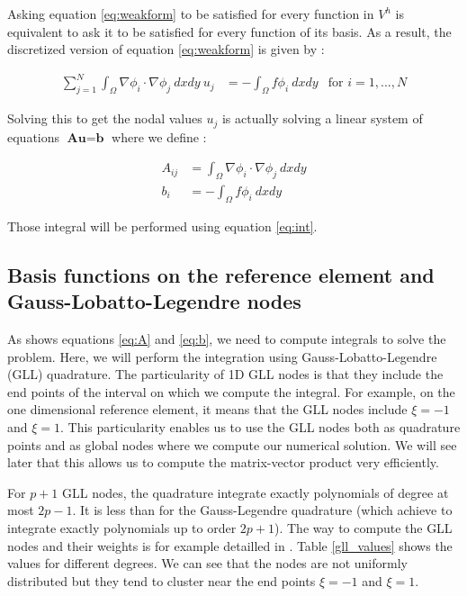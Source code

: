 Asking equation \ref{eq:weakform} to be satisfied for every function in $V^h$ is equivalent to ask it to be satisfied for every function of its basis. As a result, the discretized version of equation \ref{eq:weakform} is given by : 

\begin{align}
\sum_{j = 1}^N \int_\Omega \nabla \phi_i \cdot \nabla \phi_j \:dxdy \: u_j &= -\int_\Omega f\phi_i \:dxdy &\text{for $i=1,...,N$} 
\end{align}

Solving this to get the nodal values $u_j$ is actually solving a linear system of equations $\textbf{Au}=\textbf{b}$ where we define : 

\begin{align}
A_{ij} &= \int_\Omega \nabla \phi_i \cdot \nabla \phi_j \:dxdy \label{eq:A}\\
b_i &= -\int_\Omega f\phi_i \:dxdy \label{eq:b}
\end{align}

Those integral will be performed using equation \ref{eq:int}.

\subsection{Basis functions on the reference element and Gauss-Lobatto-Legendre nodes}

As shows equations \ref{eq:A} and \ref{eq:b}, we need to compute integrals to solve the problem. Here, we will perform the integration using Gauss-Lobatto-Legendre (GLL) quadrature. The particularity of 1D GLL nodes is that they include the end points of the interval on which we compute the integral. For example, on the one dimensional reference element, it means that the GLL nodes include $\xi = -1$ and $\xi=1$. This particularity enables us to use the GLL nodes both as quadrature points and as global nodes where we compute our numerical solution. We will see later that this allows us to compute the matrix-vector product very efficiently. 

For $p+1$ GLL nodes, the quadrature integrate exactly polynomials of degree at most $2p-1$. It is less than for the Gauss-Legendre quadrature (which achieve to integrate exactly polynomials up to order $2p+1$). The way to compute the GLL nodes and their weights is for example detailled in \cite{gll_nodes}. Table \ref{gll_values} shows the values for different degrees. We can see that the nodes are not uniformly distributed but they tend to cluster near the end points $\xi = -1$ and $\xi=1$.

